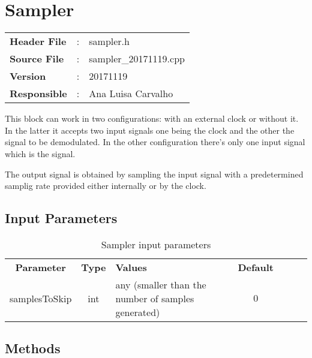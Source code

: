 \clearpage

\section{Sampler}

\begin{tcolorbox}	
	\begin{tabular}{p{2.75cm} p{0.2cm} p{10.5cm}} 	
		\textbf{Header File}   &:& sampler.h \\
		\textbf{Source File}   &:& sampler\_20171119.cpp \\
		\textbf{Version} &:& 20171119 \\
		\textbf{Responsible} &:& Ana Luisa Carvalho
	\end{tabular}
\end{tcolorbox}

This block can work in two configurations: with an external clock or without it. In the latter it accepts two input signals one being the clock and the other the signal to be demodulated. In the other configuration there's only one input signal which is the signal. 

The output signal is obtained by sampling the input signal with a predetermined samplig rate provided either internally or by the clock.

\subsection*{Input Parameters}

\begin{table}[h]
	\centering
	\begin{tabular}{|c|c|p{60mm}|c|ccp{60mm}}
		\cline{1-4}
		\textbf{Parameter} & \textbf{Type} & \textbf{Values} &   \textbf{Default}& \\ \cline{1-4}
		samplesToSkip & int & any (smaller than the number of samples generated) & $0$ \\ \cline{1-4}
	\end{tabular}
	\caption{Sampler input parameters}
	\label{table:sampler_in_par}
\end{table}


\subsection*{Methods}
 
